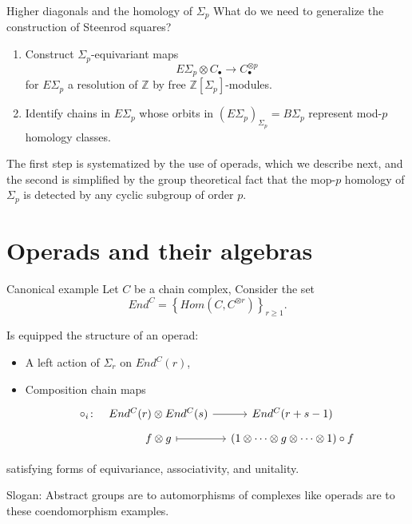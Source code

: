\documentclass[10pt,t]{beamer}
\begin{document}
\begin{frame}{Higher diagonals and the homology of $\Sigma_p$}
	What do we need to generalize the construction of Steenrod squares?
	
	\pause \vspace{10pt}
	
	\begin{enumerate}
		\item Construct $\Sigma_p$-equivariant maps
		\begin{equation*}
		E\Sigma_p \otimes C_\bullet \to C_\bullet^{\otimes p}
		\end{equation*}
		for $E\Sigma_p$ a resolution of $\mathbb Z$ by free $\mathbb Z[\Sigma_p]$-modules.
		\vspace*{10pt} \pause
		\item Identify chains in $E\Sigma_p$ whose orbits in $(E\Sigma_p)_{\Sigma_p} = B\Sigma_p$ represent mod-$p$ homology classes.
	\end{enumerate}

	\vspace*{10pt}\pause

	The first step is systematized by the use of operads, which we describe next, and the second is simplified by the group theoretical fact that the mop-$p$ homology of $\Sigma_p$ is detected by any cyclic subgroup of order $p$.
\end{frame}


\section{Operads and their algebras}

\begin{frame}[fragile]{Canonical example}
	Let $C$ be a chain complex, Consider the set
	\begin{equation*}
	End^C = \left\{Hom(C, C^{\otimes r})\right\}_{r \geq 1}.
	\end{equation*}
	
	\pause
	
	Is equipped the structure of an operad:
	\begin{itemize}
		\item A left action of $\Sigma_r$ on $End^C(r)$,
		\item Composition chain maps
		\begin{equation*}
		\begin{tikzcd}[column sep=small, row sep=tiny]
		\circ_i \colon &[-10pt] End^C(r) \otimes End^C(s) \arrow[r] & End^C(r+s-1) \\
		& f \otimes g \arrow[r, |->] & (1 \otimes \cdots \otimes g \otimes \cdots \otimes 1) \circ f 
		\end{tikzcd}
		\end{equation*}
	\end{itemize}
	satisfying forms of equivariance, associativity, and unitality.
	
	\pause \vspace*{10pt}
	
	\textcolor{pblue}{Slogan:} Abstract groups are to automorphisms of complexes like operads are to these coendomorphism examples.
\end{frame}
\end{document}
